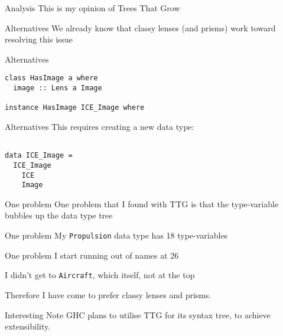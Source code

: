 \begin{frame}[fragile]
\begin{block}{Analysis}
This is my opinion of Trees That Grow
\end{block}
\end{frame}

\begin{frame}[fragile]
\begin{block}{Alternatives}
We already know that classy lenses (and prisms) work toward resolving this issue
\end{block}
\end{frame}

\begin{frame}[fragile]
\begin{block}{Alternatives}
\begin{lstlisting}[style=haskell]
class HasImage a where
  image :: Lens a Image

instance HasImage ICE_Image where
\end{lstlisting}
\end{block}
\end{frame}

\begin{frame}[fragile]
\begin{block}{Alternatives}
This requires creating a new data type:
\begin{lstlisting}[style=haskell]

data ICE_Image =
  ICE_Image
    ICE
    Image
\end{lstlisting}
\end{block}
\end{frame}

\begin{frame}[fragile]
\begin{block}{One problem}
One problem that I found with TTG is that the type-variable bubbles up the data type tree
\end{block}
\end{frame}

\begin{frame}[fragile]
\begin{block}{One problem}
My \lstinline{Propulsion} data type has 18 type-variables
\end{block}
\end{frame}

\begin{frame}[fragile]
\begin{block}{One problem}
I start running out of names at 26

I didn't get to \lstinline{Aircraft}, which itself, not at the top
\end{block}
\end{frame}

\begin{frame}[fragile]
\begin{block}{Therefore}
I have come to prefer classy lenses and prisms.
\end{block}
\end{frame}

\begin{frame}[fragile]
\begin{block}{Interesting Note}
GHC plans to utilise TTG for its syntax tree, to achieve extensibility.
\end{block}
\end{frame}
